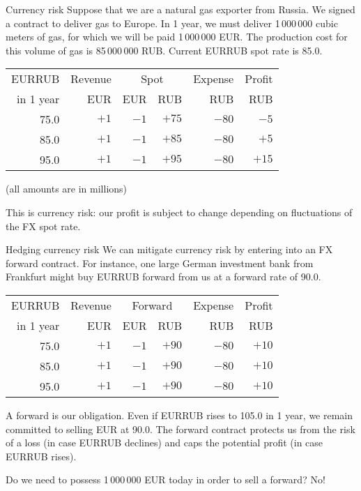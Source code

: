 \documentclass{beamer}
\begin{document}
\begin{frame}{Currency risk}
\justify
Suppose that we are a natural gas exporter from Russia. We signed a contract to deliver gas to Europe. In 1 year, we must deliver 1\,000\,000 cubic meters of gas, for which we will be paid 1\,000\,000 EUR. The production cost for this volume of gas is 85\,000\,000 RUB. Current EURRUB spot rate is 85.0.

\justify
\centering
\begin{tabular}{r|r|r|r|r|r}
EURRUB      & Revenue & \multicolumn{2}{c|}{Spot} & Expense & Profit \\
\cline{3-4}
in 1 year   & EUR   & EUR   & RUB & RUB & RUB \\ \hline
75.0        & $+1$  & $-1$ & $+75$         & $-80$  & $-5$ \\
85.0        & $+1$ & $-1$ & $+85$         & $-80$  & $+5$ \\
95.0        & $+1$ & $-1$ & $+95$          & $-80$ & $+15$ 
\end{tabular}

(all amounts are in millions)

\justify
This is \alert{currency risk}: our profit is subject to change depending on fluctuations of the FX spot rate.
\end{frame}



\begin{frame}{Hedging currency risk}
\justify
We can mitigate currency risk by entering into an FX forward contract. For instance, one large German investment bank from Frankfurt might buy EURRUB forward from us at a forward rate of 90.0.

\justify
\centering
\begin{tabular}{r|r|r|r|r|r}
EURRUB      & Revenue & \multicolumn{2}{c|}{Forward} & Expense & Profit \\
\cline{3-4}
in 1 year   & EUR     & EUR    & RUB              & RUB     & RUB   \\ \hline
75.0        & $+1$  & $-1$ & $+90$  & $-80$ & $+10$  \\
85.0        & $+1$  & $-1$ & $+90$  & $-80$ & $+10$  \\
95.0        & $+1$  & $-1$ & $+90$  & $-80$ & $+10$ 
\end{tabular}

\justify
A forward is our obligation. Even if EURRUB rises to 105.0 in 1 year, we remain committed to selling EUR at 90.0. The forward contract protects us from the risk of a loss (in case EURRUB declines) and caps the potential profit (in case EURRUB rises).

\justify
Do we need to possess 1\,000\,000 EUR today in order to sell a forward? No!
\end{frame}
\end{document}
